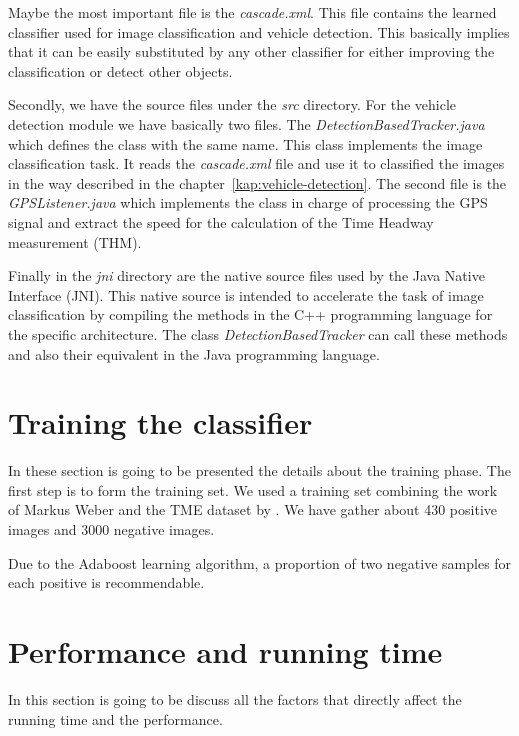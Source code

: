 Maybe the most important file is the \textit{cascade.xml}. This file contains
the learned classifier used for image classification and vehicle detection. This
basically implies that it can be easily substituted by any other classifier for
either improving the classification or detect other objects.

Secondly, we have the source files under the \textit{src} directory. For the
vehicle detection module we have basically two files. The
\textit{DetectionBasedTracker.java} which defines the class with the same name.
This class implements the image classification task. It reads the
\textit{cascade.xml} file and use it to classified the images in the way
described in the chapter~\ref{kap:vehicle-detection}. The second file is the
\textit{GPSListener.java} which implements the class in charge of processing the
GPS signal and extract the speed for the calculation of the Time Headway
measurement (THM). 

Finally in the \textit{jni} directory are the native source files used by the
Java Native Interface (JNI). This native source is intended to accelerate the
task of image classification by compiling the methods in the C++ programming
language for the specific architecture. The class \textit{DetectionBasedTracker} 
can call these methods and also their equivalent in the Java programming
language.


\section{Training the classifier} %
\label{sec:trainingClasssifier}

In these section is going to be presented the details about the training phase.
The first step is to form the training set. We used a training set combining the
work of Markus Weber and the TME dataset by \cite{tme}. We have gather about 430
positive images and 3000 negative images.

Due to the Adaboost learning algorithm, a proportion of two negative samples for
each positive is recommendable.


\section{Performance and running time} %
\label{sec:running-time}

In this section is going to be discuss all the factors that directly affect the
running time and the performance. 




